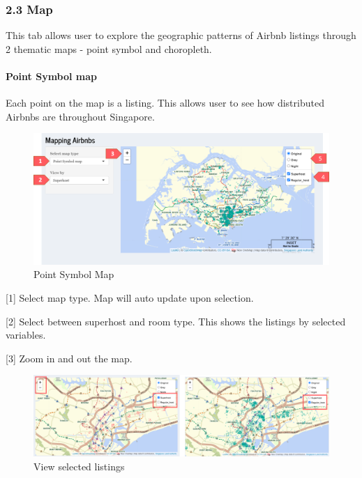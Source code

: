 \documentclass[
  12pt,
]{article}
\begin{document}
\hypertarget{map}{%
\subsubsection{2.3 Map}\label{map}}

This tab allows user to explore the geographic patterns of Airbnb
listings through 2 thematic maps - point symbol and choropleth.

\hypertarget{point-symbol-map}{%
\paragraph{Point Symbol map}\label{point-symbol-map}}

Each point on the map is a listing. This allows user to see how
distributed Airbnbs are throughout Singapore.

\begin{figure}[H]

{\centering \includegraphics[width=1\linewidth]{images/map} 

}

\caption{Point Symbol Map}\label{fig:unnamed-chunk-6}
\end{figure}

{[}1{]} Select map type. Map will auto update upon selection.

{[}2{]} Select between superhost and room type. This shows the listings
by selected variables.

{[}3{]} Zoom in and out the map.

\begin{figure}[H]

{\centering \includegraphics[width=1\linewidth]{images/map1} 

}

\caption{View selected listings}\label{fig:unnamed-chunk-7}
\end{figure}
\end{document}
